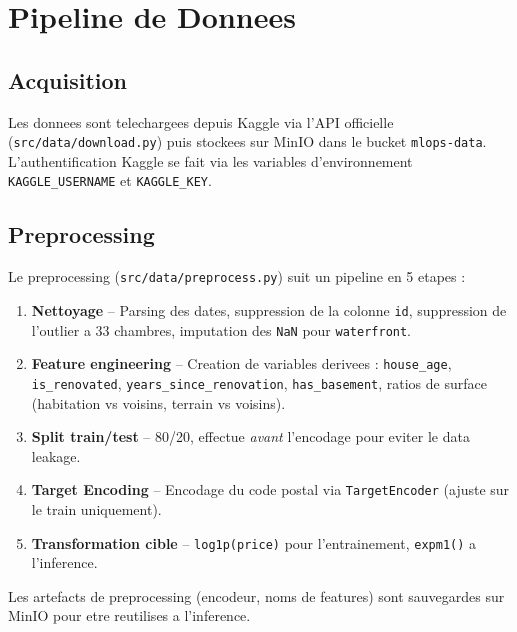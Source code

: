 \documentclass[a4paper,11pt]{article}
\begin{document}
\section{Pipeline de Donnees}

\subsection{Acquisition}

Les donnees sont telechargees depuis Kaggle via l'API officielle (\texttt{src/data/download.py})
puis stockees sur MinIO dans le bucket \texttt{mlops-data}. L'authentification Kaggle
se fait via les variables d'environnement \texttt{KAGGLE\_USERNAME} et \texttt{KAGGLE\_KEY}.

\subsection{Preprocessing}

Le preprocessing (\texttt{src/data/preprocess.py}) suit un pipeline en 5 etapes :

\begin{enumerate}
    \item \textbf{Nettoyage} -- Parsing des dates, suppression de la colonne \texttt{id},
          suppression de l'outlier a 33 chambres, imputation des \texttt{NaN} pour \texttt{waterfront}.
    \item \textbf{Feature engineering} -- Creation de variables derivees :
          \texttt{house\_age}, \texttt{is\_renovated}, \texttt{years\_since\_renovation},
          \texttt{has\_basement}, ratios de surface (habitation vs voisins, terrain vs voisins).
    \item \textbf{Split train/test} -- 80/20, effectue \emph{avant} l'encodage pour eviter le data leakage.
    \item \textbf{Target Encoding} -- Encodage du code postal via \texttt{TargetEncoder}
          (ajuste sur le train uniquement).
    \item \textbf{Transformation cible} -- \texttt{log1p(price)} pour l'entrainement,
          \texttt{expm1()} a l'inference.
\end{enumerate}

Les artefacts de preprocessing (encodeur, noms de features) sont sauvegardes sur MinIO
pour etre reutilises a l'inference.
\end{document}

